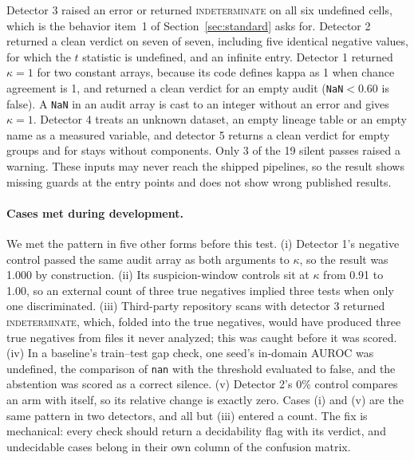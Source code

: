 \documentclass[10pt]{article}
\theoremstyle{definition}
\begin{document}
Detector 3 raised an error or returned \textsc{indeterminate} on all six undefined cells, which is the behavior item~1 of Section~\ref{sec:standard} asks for. Detector 2 returned a clean verdict on seven of seven, including five identical negative values, for which the $t$ statistic is undefined, and an infinite entry. Detector 1 returned $\kappa=1$ for two constant arrays, because its code defines kappa as 1 when chance agreement is 1, and returned a clean verdict for an empty audit (\texttt{NaN}$<0.60$ is false). A \texttt{NaN} in an audit array is cast to an integer without an error and gives $\kappa=1$. Detector 4 treats an unknown dataset, an empty lineage table or an empty name as a measured variable, and detector 5 returns a clean verdict for empty groups and for stays without components. Only 3 of the 19 silent passes raised a warning. These inputs may never reach the shipped pipelines, so the result shows missing guards at the entry points and does not show wrong published results.

\paragraph{Cases met during development.} We met the pattern in five other forms before this test. (i) Detector 1's negative control passed the same audit array as both arguments to $\kappa$, so the result was 1.000 by construction. (ii) Its suspicion-window controls sit at $\kappa$ from 0.91 to 1.00, so an external count of three true negatives implied three tests when only one discriminated. (iii) Third-party repository scans with detector 3 returned \textsc{indeterminate}, which, folded into the true negatives, would have produced three true negatives from files it never analyzed; this was caught before it was scored. (iv) In a baseline's train--test gap check, one seed's in-domain AUROC was undefined, the comparison of \texttt{nan} with the threshold evaluated to false, and the abstention was scored as a correct silence. (v) Detector 2's 0\% control compares an arm with itself, so its relative change is exactly zero. Cases (i) and (v) are the same pattern in two detectors, and all but (iii) entered a count. The fix is mechanical: every check should return a decidability flag with its verdict, and undecidable cases belong in their own column of the confusion matrix.
\end{document}
